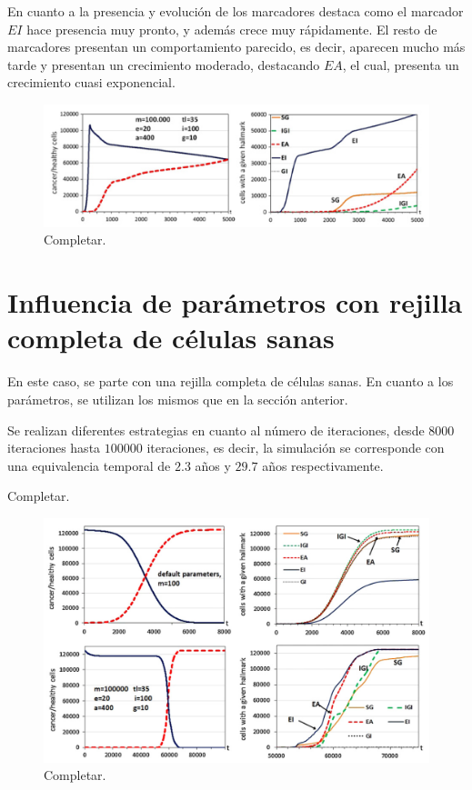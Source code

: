 En cuanto a la presencia y evolución de los marcadores destaca como el marcador $EI$ hace
presencia muy pronto, y además crece muy rápidamente. El resto de marcadores presentan un
comportamiento parecido, es decir, aparecen mucho más tarde y presentan un crecimiento moderado,
destacando $EA$, el cual, presenta un crecimiento cuasi exponencial.

\begin{figure}[h]
\centering
\includegraphics[scale=0.8]{figures/experiments/exp4}
\caption{Completar.}
\end{figure}

\section{Influencia de parámetros con rejilla completa de células sanas}

En este caso, se parte con una rejilla completa de células sanas. En cuanto a los parámetros,
se utilizan los mismos que en la sección anterior.

Se realizan diferentes estrategias en cuanto al número de iteraciones, desde $8000$ iteraciones
hasta $100000$ iteraciones, es decir, la simulación se corresponde con una equivalencia temporal
de $2.3$ años y $29.7$ años respectivamente.

Completar.

\begin{figure}[h]
\centering
\includegraphics[scale=0.5]{figures/experiments/exp5}
\caption{Completar.}
\end{figure}

